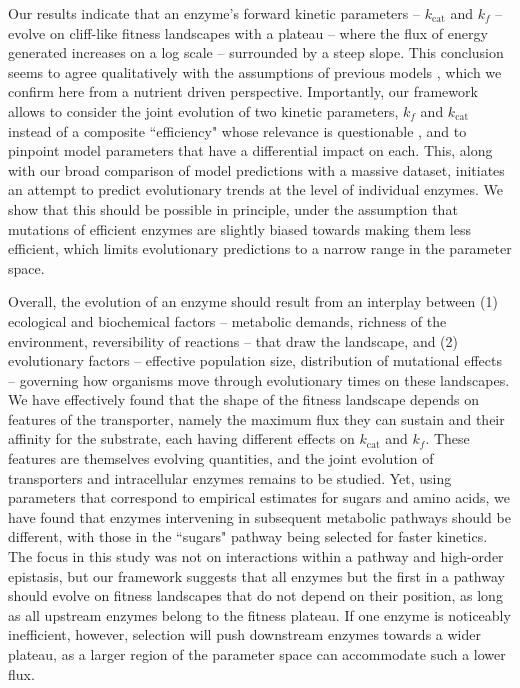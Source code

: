 \documentclass[11pt,onecolumn]{article}
\begin{document}
Our results indicate that an enzyme's forward kinetic parameters -- $k_\text{cat}$ and $k_f$ -- evolve on cliff-like fitness landscapes with a plateau -- where the flux of energy generated increases on a log scale -- surrounded by a steep slope. This conclusion seems to agree qualitatively with the assumptions of previous models \citep{Hartl85,Kaltenbach14}, which we confirm here from a nutrient driven perspective.
Importantly, our framework allows to consider the joint evolution of two kinetic parameters, $k_f$ and $k_\text{cat}$ instead of a composite ``efficiency" whose relevance is questionable \citep{Koshland02,Eisenthal07}, and to pinpoint model parameters that have a differential impact on each. This, along with our broad comparison of model predictions with a massive dataset, initiates an attempt to predict evolutionary trends at the level of individual enzymes. We show that this should be possible in principle, under the assumption that mutations of efficient enzymes are slightly biased towards making them less efficient, which limits evolutionary predictions to a narrow range in the parameter space.

Overall, the evolution of an enzyme should result from an interplay between (1) ecological and biochemical factors -- metabolic demands, richness of the environment, reversibility of reactions -- that draw the landscape, and (2) evolutionary factors -- effective population size, distribution of mutational effects -- governing how organisms move through evolutionary times on these landscapes. We have effectively found that the shape of the fitness landscape depends on features of the transporter, namely the maximum flux they can sustain and their affinity for the substrate, each having different effects on $k_\text{cat}$ and $k_f$. These features are themselves evolving quantities, and the joint evolution of transporters and intracellular enzymes remains to be studied. Yet, using parameters that correspond to empirical estimates for sugars and amino acids, we have found that enzymes intervening in subsequent metabolic pathways should be different, with those in the ``sugars" pathway being selected for faster kinetics. The focus in this study was not on interactions within a pathway and high-order epistasis, but our framework suggests that all enzymes but the first in a pathway should evolve on fitness landscapes that do not depend on their position, as long as all upstream enzymes belong to the fitness plateau. If one enzyme is noticeably inefficient, however, selection will push downstream enzymes towards a wider plateau, as a larger region of the parameter space can accommodate such a lower flux.
\end{document}
